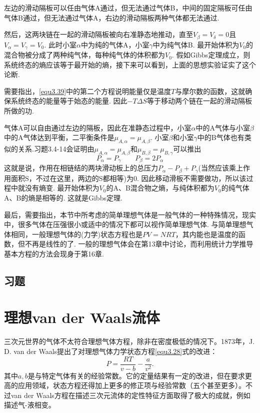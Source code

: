 左边的滑动隔板可以任由气体A通过，但无法通过气体B，中间的固定隔板可任由气体B通过，但无法通过气体A，右边的滑动隔板两种气体都无法通过.

然后，这两块链在一起的滑动隔板被向右准静态地推动，直至$V_\beta=V_\delta=0$且$V_\alpha=V_\gamma=V_0$. 此时小室$\alpha$中为纯的气体A，小室$\gamma$中为纯气体B. 最开始体积为$V_0$的混合物被分成了两种纯气体，每种纯气体的体积都为$V_0$. 假如Gibbs定理成立，则系统终态的熵应该等于最开始的熵，接下来可以看到，上面的思想实验证实了这个论断.

需要指出，\eqref{equ3.39}中的第二个方程说明能量仅是温度$T$与摩尔数的函数，这就确保系统终态的能量等于始态的能量. 因此$-T\Delta S$等于移动两个链在一起的滑动隔板所做的功.

气体A可以自由通过左边的隔板，因此在准静态过程中，小室$\alpha$中的A气体与小室$\beta$中的A气体达到平衡，二平衡条件是$\mu_{A,\alpha}=\mu_{A,\beta}$. 小室$\beta$和小室$\gamma$中的B气体也有类似的关系.习题3.4-14会证明由$\mu_{A,\alpha}=\mu_{A,\beta}$和$\mu_{B,\beta}=\mu_{B,\gamma}$可以推出
\begin{equation*}
P_\alpha=P_\gamma \qquad P_\beta=2P_\alpha
\end{equation*}
这就是说，作用在相链结的两块滑动板上的总压力$P_\alpha-P_\beta+ P_\gamma$(当然应该乘上作用面积S，不过在这里，两边的S都相等)为0. 因此移动滑板不需要做功，所以该过程中就没有熵变. 最开始体积为$V_0$的A、B混合物之熵，与纯体积都为$V_0$的纯气体A、B的熵是相等的. 这就是Gibbs定理.

最后，需要指出，本节中所考虑的简单理想气体是一般气体的一种特殊情况，现实中，很多气体在压强很小或适中的情况下都可以视作简单理想气体. 与简单理想气体相同，一般理想气体的(力学)状态方程也是$PV=NRT$，其内能也是温度的函数，但不再是线性的了. 一般的理想气体会在第13章中讨论，而利用统计力学推导基本方程的方法会现身于第16章.

\subsection*{习题}

\section{理想van der Waals流体}
\label{sec3.5}
三次元世界的气体不太符合理想气体方程，除非在密度极低的情况下。1873年，J. D. van der Waals提出了对理想气体力学状态方程\eqref{equ3.28}式的改进：
\begin{equation}
    P = \frac{RT}{v - b} - \frac{a}{v^2}.
\label{equ3.41}
\end{equation}
其中$a, b$是与特定气体有关的经验常数。它的定量结果有一定的改进，但在要求更高的应用领域，状态方程还得加上更多的修正项与经验常数（五个甚至更多）。不过van der Waals方程在描述三次元流体的定性特征方面取得了极大的成就，例如描述气-液相变。

